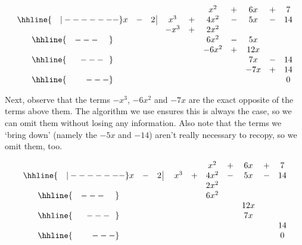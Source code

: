 \setlength\arraycolsep{0.1pt}
\setlength\extrarowheight{2pt}

\[ \begin{array}{cccccccccc}

& & & & & x^2 & + & 6x & + & 7 \\ \hhline{~~~|-------}

x & - & 2 \, \vline& x^3 & + & 4x^2 & - & 5x & - & 14 \\

 &  &  &  -x^3  & + &   2x^2 &  &  &  &  \\ \hhline{~~~---~~~~} 
 &  &  &   &  & 6 x^2 & - & 5x &  &  \\ 
 &  &  &   & &-6 x^2  & + &  12x &  &  \\ \hhline{~~~~~---~~} 
 &  &  &   &   &  & & 7x  & - & 14 \\
 &  &  &   &   &  & & - 7x  & + &  14  \\ \hhline{~~~~~~~---} 
 &   &  &  &  &  &  &  &  & 0
 
\end{array}\]

\setlength\arraycolsep{5pt}
\setlength\extrarowheight{0pt}


Next, observe that the terms $-x^3$, $-6x^2$ and $-7x$ are the exact opposite of the terms above them.  The algorithm we use ensures this is always the case, so we can omit them without losing any information. Also note that the terms we `bring down' (namely the $-5x$ and $-14$) aren't really necessary to recopy, so we omit them, too.


\setlength\arraycolsep{0.1pt}
\setlength\extrarowheight{2pt}

\[ \begin{array}{cccccccccc}

& & & & & x^2 & + & 6x & + & 7 \\ \hhline{~~~|-------}

x & - & 2 \, \vline& \, \, x^3 & + & 4x^2 & - & 5x & - & 14 \\

 &  &  &   &  &   2x^2 &  &  &  &  \\ \hhline{~~~---~~~~} 
 &  &  &   &  & 6 x^2 &  &  &  &  \\ 
 &  &  &   & &  &  &  12x &  &  \\ \hhline{~~~~~---~~} 
 &  &  &   &   &  & & 7x  &  &  \\
 &  &  &   &   &  & &   &  &  14  \\ \hhline{~~~~~~~---} 
 &   &  &  &  &  &  &  &  & 0
 
\end{array}\]

